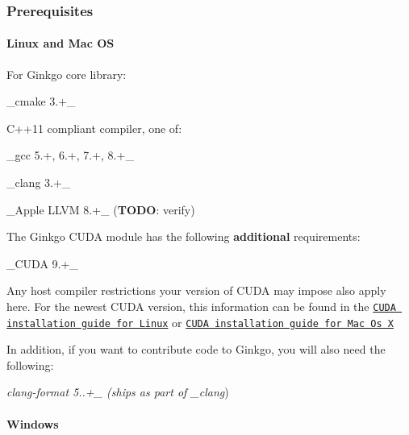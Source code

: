 \subsubsection*{Prerequisites}

\paragraph*{Linux and Mac OS}

For Ginkgo core library\+:


\begin{DoxyItemize}
\item \+\_\+cmake 3.+\+\_\+
\item C++11 compliant compiler, one of\+:
\begin{DoxyItemize}
\item \+\_\+gcc 5.+, 6.+, 7.+, 8.+\+\_\+
\item \+\_\+clang 3.+\+\_\+
\item \+\_\+\+Apple L\+L\+VM 8.+\+\_\+ ({\bfseries T\+O\+DO}\+: verify)
\end{DoxyItemize}
\end{DoxyItemize}

The Ginkgo C\+U\+DA module has the following {\bfseries additional} requirements\+:


\begin{DoxyItemize}
\item \+\_\+\+C\+U\+DA 9.+\+\_\+
\item Any host compiler restrictions your version of C\+U\+DA may impose also apply here. For the newest C\+U\+DA version, this information can be found in the \href{https://docs.nvidia.com/cuda/cuda-installation-guide-linux/index.html}{\tt C\+U\+DA installation guide for Linux} or \href{https://docs.nvidia.com/cuda/cuda-installation-guide-mac-os-x/index.html}{\tt C\+U\+DA installation guide for Mac Os X}
\end{DoxyItemize}

In addition, if you want to contribute code to Ginkgo, you will also need the following\+:


\begin{DoxyItemize}
\item {\itshape clang-\/format 5..+\+\_\+ (ships as part of \+\_\+clang})
\end{DoxyItemize}

\paragraph*{Windows}

